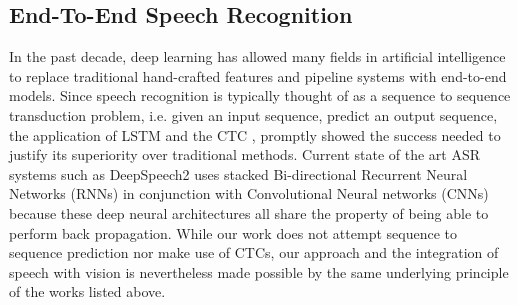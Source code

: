 \documentclass[letterpaper]{article} %
\begin{document}
\subsection{End-To-End Speech Recognition}
In the past decade, deep learning has allowed many fields in artificial intelligence to replace traditional hand-crafted features and pipeline systems with end-to-end models. Since speech recognition is typically thought of as a sequence to sequence transduction problem, i.e. given an input sequence, predict an output sequence, the application of LSTM and the CTC ,  promptly showed the success needed to justify its superiority over traditional methods. Current state of the art ASR systems such as DeepSpeech2  uses stacked Bi-directional Recurrent Neural Networks (RNNs) in conjunction with Convolutional Neural networks (CNNs) because these deep neural architectures all share the property of being able to perform back propagation. While our work does not attempt sequence to sequence prediction nor make use of CTCs, our approach and the integration of speech with vision is nevertheless made possible by the same underlying principle of the works listed above.
\end{document}
